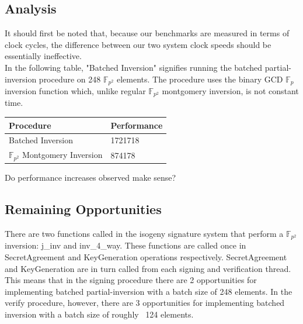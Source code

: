 \subsection{Analysis}

It should first be noted that, because our benchmarks are measured in terms of clock cycles, the difference between our two system clock speeds should be essentially ineffective. \\

In the following table, "Batched Inversion" signifies running the batched partial-inversion procedure on 248 $\mathbb{F}_{p^{2}}$ elements. The procedure uses the binary GCD $\mathbb{F}_{p}$ inversion function which, unlike regular $\mathbb{F}_{p^{2}}$ montgomery inversion, is not constant time.\\

\begin{center}
\begin{tabular}{@{}ll@{}}
	\toprule
	Procedure & Performance \\
	\midrule
	Batched Inversion & 1721718\\
	$\mathbb{F}_{p^{2}}$ Montgomery Inversion & 874178\\
	\bottomrule
\end{tabular}
\end{center}

Do performance increases observed make sense?\\

\subsection{Remaining Opportunities}
There are two functions called in the isogeny signature system that perform a $\mathbb{F}_{p^{2}}$ inversion: j\_inv and inv\_4\_way. These functions are called once in SecretAgreement and KeyGeneration operations respectively. SecretAgreement and KeyGeneration are in turn called from each signing and verification thread.\\

This means that in the signing procedure there are 2 opportunities for implementing batched partial-inversion with a batch size of 248 elements. In the verify procedure, however, there are 3 opportunities for implementing batched inversion with a batch size of roughly ~124 elements.\\

